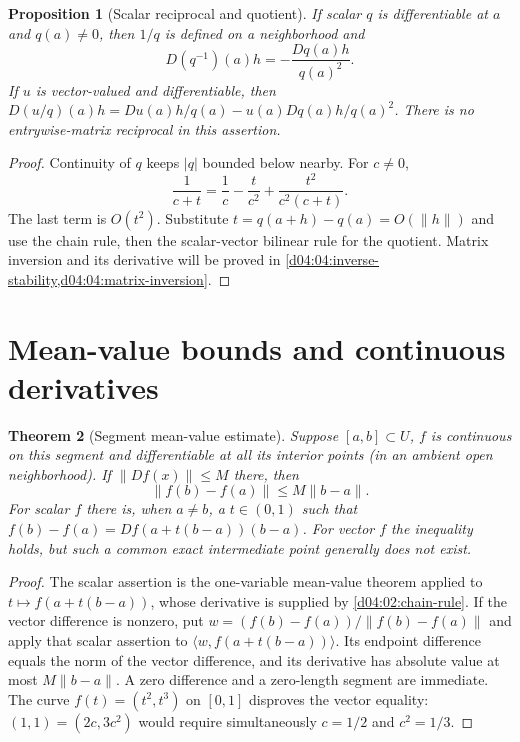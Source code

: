 \documentclass[11pt,oneside,openany]{book}
\newtheorem{theorem}{Theorem}[chapter]
\newtheorem{proposition}[theorem]{Proposition}
\theoremstyle{definition}
\theoremstyle{remark}
\newcommand{\abs}[1]{\lvert#1\rvert}
\newcommand{\norm}[1]{\lVert#1\rVert}
\newcommand{\ip}[2]{\langle#1,#2\rangle}
\newcommand{\family}[1]{}
\begin{document}
\begin{proposition}[Scalar reciprocal and quotient]\label{d04:02:quotient-rule}
If scalar $q$ is differentiable at $a$ and $q(a)\ne0$, then $1/q$ is defined
on a neighborhood and
\[
 D(q^{-1})(a)h=-\frac{Dq(a)h}{q(a)^2}.
\]
If $u$ is vector-valued and differentiable, then
$D(u/q)(a)h=Du(a)h/q(a)-u(a)Dq(a)h/q(a)^2$.
There is no entrywise-matrix reciprocal in this assertion.
\end{proposition}
\begin{proof}
Continuity of $q$ keeps $\abs{q}$ bounded below nearby. For $c\ne0$,
\[
 \frac1{c+t}=\frac1c-\frac t{c^2}+
 \frac{t^2}{c^2(c+t)}.
\]
The last term is $O(t^2)$. Substitute $t=q(a+h)-q(a)=O(\norm{h})$
and use the chain rule, then the scalar-vector bilinear rule for the quotient.
Matrix inversion and its derivative will be proved in
\cref{d04:04:inverse-stability,d04:04:matrix-inversion}.
\end{proof}

\section{Mean-value bounds and continuous derivatives}
\family{K04.02.08}\family{K04.02.09}\family{K04.02.10}\family{K04.02.11}

\begin{theorem}[Segment mean-value estimate]\label{d04:02:mean-value}
Suppose $[a,b]\subset U$, $f$ is continuous on this segment and
differentiable at all its interior points (in an ambient open neighborhood).
If $\norm{Df(x)}\leq M$ there, then
\[
 \norm{f(b)-f(a)}\leq M\norm{b-a}.
\]
For scalar $f$ there is, when $a\ne b$, a $t\in(0,1)$ such that
$f(b)-f(a)=Df(a+t(b-a))(b-a)$. For vector $f$ the inequality holds,
but such a common exact intermediate point generally does not exist.
\end{theorem}
\begin{proof}
The scalar assertion is the one-variable mean-value theorem applied to
$t\mapsto f(a+t(b-a))$, whose derivative is supplied by
\cref{d04:02:chain-rule}. If the vector difference is nonzero, put
$w=(f(b)-f(a))/\norm{f(b)-f(a)}$ and apply that scalar assertion to
$\ip{w}{f(a+t(b-a))}$. Its endpoint difference equals the norm of the
vector difference, and its derivative has absolute value at most
$M\norm{b-a}$. A zero difference and a zero-length segment are immediate.
The curve $f(t)=(t^2,t^3)$ on $[0,1]$ disproves the vector equality:
$(1,1)=(2c,3c^2)$ would require simultaneously $c=1/2$ and $c^2=1/3$.
\end{proof}
\end{document}
